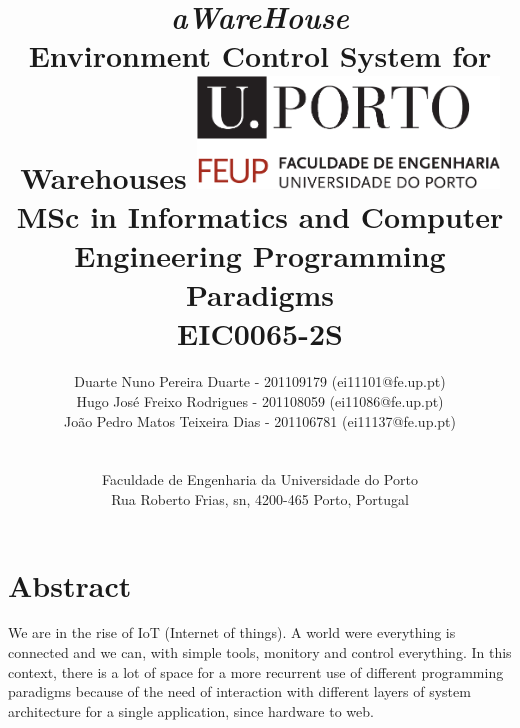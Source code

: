 \documentclass[12pt]{article}
\begin{document}
\setlength{\textwidth}{16cm}
\setlength{\textheight}{22cm}
\title{\huge{\textbf{\textit{aWareHouse}}}\linebreak
\Large\textbf{\\Environment Control System for Warehouses}\linebreak\linebreak\linebreak
\includegraphics[width=8cm]{feup.pdf}\linebreak \linebreak
\large{MSc in Informatics and Computer Engineering} \linebreak
\large{Programming Paradigms \\ EIC0065-2S}\linebreak
}
\author{
Duarte Nuno Pereira Duarte - 201109179 (ei11101@fe.up.pt)\\
Hugo José Freixo Rodrigues - 201108059 (ei11086@fe.up.pt)\\
João Pedro Matos Teixeira Dias - 201106781 (ei11137@fe.up.pt)\\
\\
\\ Faculdade de Engenharia da Universidade do Porto \\ Rua Roberto Frias, s\/n, 4200-465 Porto, Portugal
 \vspace{1cm}}
\maketitle
\thispagestyle{empty}


\newpage
\section*{Abstract}

We are in the rise of IoT (Internet of things). A world were everything is connected and we can, with simple tools, monitory and control everything. In this context, there is a lot of space for a more recurrent use of different programming paradigms because of the need of interaction with different layers of system architecture for a single application, since hardware to web.
\end{document}
